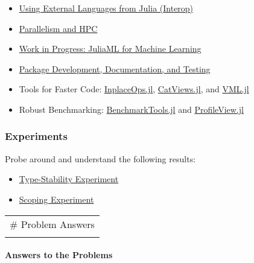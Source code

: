 \documentclass[11pt]{article}
\begin{document}
\begin{itemize}
\itemsep1pt\parskip0pt
\item
  \href{http://ucidatascienceinitiative.github.io/IntroToJulia/Html/Interop}{Using
  External Languages from Julia (Interop)}
\item
  \href{http://ucidatascienceinitiative.github.io/IntroToJulia/Html/HPCJulia}{Parallelism
  and HPC}
\item
  \href{http://ucidatascienceinitiative.github.io/IntroToJulia/Html/JuliaML}{Work
  in Progress: JuliaML for Machine Learning}
\item
  \href{http://ucidatascienceinitiative.github.io/IntroToJulia/Html/PackageDevelopment}{Package
  Development, Documentation, and Testing}
\item
  Tools for Faster Code:
  \href{https://github.com/simonbyrne/InplaceOps.jl}{InplaceOps.jl},
  \href{https://github.com/ahwillia/CatViews.jl}{CatViews.jl}, and
  \href{https://github.com/JuliaMath/VML.jl}{VML.jl}
\item
  Robust Benchmarking:
  \href{https://github.com/JuliaCI/BenchmarkTools.jl}{BenchmarkTools.jl}
  and \href{https://github.com/timholy/ProfileView.jl}{ProfileView.jl}
\end{itemize}

\subsubsection{Experiments}\label{experiments}

Probe around and understand the following results:

\begin{itemize}
\itemsep1pt\parskip0pt
\item
  \href{http://ucidatascienceinitiative.github.io/IntroToJulia/Html/TypeStabilityExperiment}{Type-Stability
  Experiment}
\item
  \href{http://ucidatascienceinitiative.github.io/IntroToJulia/Html/ScopingExperiment}{Scoping
  Experiment}
\end{itemize}

    \begin{longtable}[c]{@{}l@{}}
\toprule\addlinespace
\# Problem Answers
\\\addlinespace
\bottomrule
\end{longtable}

\paragraph{Answers to the Problems}\label{answers-to-the-problems}
\end{document}
